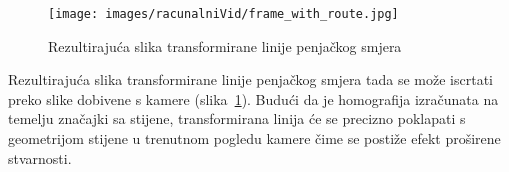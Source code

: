 \begin{figure}[H]
    \centering
    \texttt{[image: images/racunalniVid/frame\_with\_route.jpg]}
    \caption{Rezultirajuća slika transformirane linije penjačkog smjera}
    \label{fig:transformacija_perspektive}
\end{figure}

Rezultirajuća slika transformirane linije penjačkog smjera tada se može iscrtati preko slike dobivene s kamere (slika~\ref{fig:transformacija_perspektive}). Budući da je homografija izračunata na temelju značajki sa stijene, transformirana linija će se precizno poklapati s geometrijom stijene u trenutnom pogledu kamere čime se postiže efekt proširene stvarnosti.